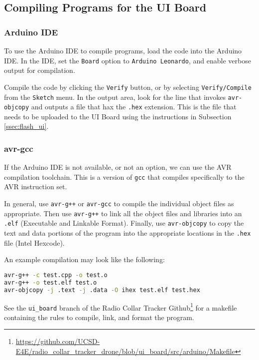 \documentclass{report}
\begin{document}
			\subsection{Compiling Programs for the UI Board} \label{ssec:ui_compile}
				\subsubsection{Arduino IDE} \label{sssec:ui_arduino_compile}
					To use the Arduino IDE to compile programs, load the code into the Arduino IDE.  In the IDE, set the \lstinline{Board} option to \lstinline{Arduino Leonardo}, and enable verbose output for compilation.

					Compile the code by clicking the \lstinline{Verify} button, or by selecting \lstinline{Verify/Compile} from the \lstinline{Sketch} menu.  In the output area, look for the line that invokes \lstinline{avr-objcopy} and outputs a file that hax the \lstinline{.hex} extension.  This is the file that needs to be uploaded to the UI Board using the instructions in Subsection \ref{ssec:flash_ui}.

				\subsubsection{avr-gcc} \label{sssec:ui_make_compile}
					If the Arduino IDE is not available, or not an option, we can use the AVR compilation toolchain.  This is a version of \lstinline{gcc} that compiles specifically to the AVR instruction set.

					In general, use \lstinline{avr-g++} or \lstinline{avr-gcc} to compile the individual object files as appropriate.  Then use \lstinline{avr-g++} to link all the object files and libraries into an \lstinline{.elf} (Executable and Linkable Format).  Finally, use \lstinline{avr-objcopy} to copy the text and data portions of the program into the appropriate locations in the \lstinline{.hex} file (Intel Hexcode).

					An example compilation may look like the following:

					\begin{lstlisting}[language=sh, caption={Example avr-gcc compilation}, label={lst:avr-gcc_example}]
avr-g++ -c test.cpp -o test.o
avr-g++ -o test.elf test.o
avr-objcopy -j .text -j .data -O ihex test.elf test.hex
					\end{lstlisting}

					See the \lstinline{ui_board} branch of the Radio Collar Tracker Github\footnote{\url{https://github.com/UCSD-E4E/radio_collar_tracker_drone/blob/ui_board/src/arduino/Makefile}} for a makefile containing the rules to compile, link, and format the program.
\end{document}
